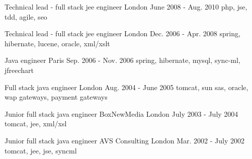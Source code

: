 

\begin{cventries}

  \cventry
    {Technical lead - full stack jee engineer} %
    {} %
    {London} %
    {June 2008 - Aug. 2010} %
    {php, jse, tdd, agile, seo} %
    {}

  \cventry
    {Technical lead - full stack jee engineer} %
    {} %
    {London} %
    {Dec. 2006 - Apr. 2008} %
    {spring, hibernate, lucene, oracle, xml/xslt} %
    {}

  \cventry
    {Java engineer} %
    {} %
    {Paris} %
    {Sep. 2006 - Nov. 2006} %
    {spring, hibernate, mysql, sync-ml, jfreechart} %
    {}

  \cventry
    {Full stack java engineer} %
    {} %
    {London} %
    {Aug. 2004 - June 2005} %
    {tomcat, sun sas, oracle, wap gateways, payment gateways} %
    {}

  \cventry
    {Junior full stack java engineer} %
    {BoxNewMedia} %
    {London} %
    {July 2003 - July 2004} %
    {tomcat, jee, xml/xsl} %
    {}

  \cventry
    {Junior full stack java engineer} %
    {AVS Consulting} %
    {London} %
    {Mar. 2002 - July 2002} %
    {tomcat, jee, jse, syncml} %
    {}

\end{cventries}
